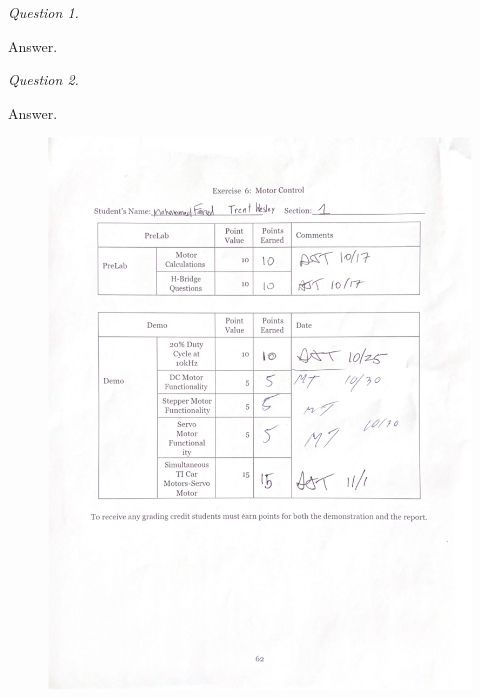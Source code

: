 \documentclass[CMPE]{KGCOEReport}
\begin{document}
\emph{Question 1.}

Answer.

\bigskip

\emph{Question 2.}

Answer.

\newpage
\begin{figure}[H]
    \centering
    \begin{adjustbox}{center}
        \includegraphics[width=1.26\textwidth]{signoff.pdf}
    \end{adjustbox}
\end{figure}
\end{document}
